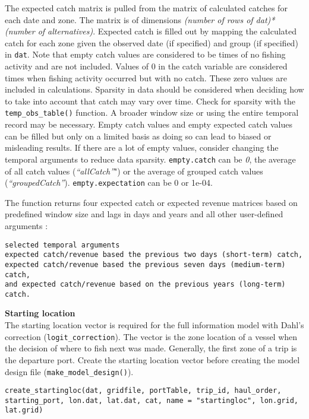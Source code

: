 \documentclass[
]{article}
\begin{document}
The expected catch matrix is pulled from the matrix of calculated catches for each date and zone. The matrix is of dimensions \emph{(number of rows of dat)*(number of alternatives)}. Expected catch is filled out by mapping the calculated catch for each zone given the observed date (if specified) and group (if specified) in \texttt{dat}. Note that empty catch values are considered to be times of no fishing activity and are not included. Values of 0 in the catch variable are considered times when fishing activity occurred but with no catch. These zero values are included in calculations. Sparsity in data should be considered when deciding how to take into account that catch may vary over time. Check for sparsity with the \texttt{temp\_obs\_table()} function. A broader window size or using the entire temporal record may be necessary. Empty catch values and empty expected catch values can be filled but only on a limited basis as doing so can lead to biased or misleading results. If there are a lot of empty values, consider changing the temporal arguments to reduce data sparsity. \texttt{empty.catch} can be \emph{0}, the average of all catch values (\emph{``allCatch''}") or the average of grouped catch values (\emph{``groupedCatch''}). \texttt{empty.expectation} can be 0 or 1e-04.

The function returns four expected catch or expected revenue matrices based on predefined window size and lags in days and years and all other user-defined arguments :

\begin{verbatim}
selected temporal arguments
expected catch/revenue based the previous two days (short-term) catch,
expected catch/revenue based the previous seven days (medium-term) catch,
and expected catch/revenue based on the previous years (long-term) catch.
\end{verbatim}

\textbf{Starting location}\\
The starting location vector is required for the full information model with Dahl's correction (\texttt{logit\_correction}). The vector is the zone location of a vessel when the decision of where to fish next was made. Generally, the first zone of a trip is the departure port. Create the starting location vector before creating the model design file (\texttt{make\_model\_design()}).

\begin{verbatim}
create_startingloc(dat, gridfile, portTable, trip_id, haul_order, starting_port, lon.dat, lat.dat, cat, name = "startingloc", lon.grid, lat.grid)
\end{verbatim}
\end{document}
